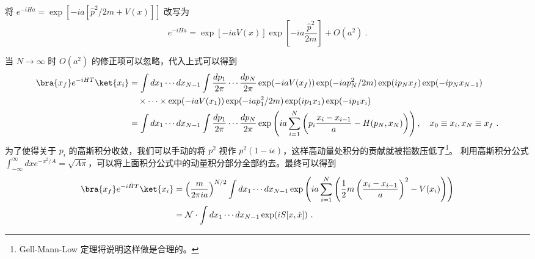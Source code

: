 将 $e^{-iH a}=\exp[-ia[\hat p^2/2m + V(x)]]$ 改写为
\begin{equation}
        e^{-iH a}
        =\exp[-iaV(x)]\exp\left[-ia\frac{\hat p^2}{2m}\right]+O(a^2)~.
\end{equation}

当 $N\rightarrow \infty$ 时 $O(a^2)$ 的修正项可以忽略，代入上式可以得到
\begin{equation}
\begin{aligned}
        \bra{x_f}e^{-iHT}\ket{x_i}&=\int d x_1\cdots d x_{N-1}\int \frac{d p_1}{2\pi} \cdots \frac{d p_N}{2\pi}
        \exp(-iaV(x_f))\exp(-iap_N^2/2m) \exp(ip_Nx_f)\exp(-ip_N x_{N-1})
        \\
        &\quad \times \cdots \times 
        \exp(-iaV(x_1))\exp(-iap_1^2/2m) \exp(ip_1x_1)\exp(-ip_1 x_{i})
        \\
        &=\int d x_1\cdots d x_{N-1}\int \frac{d p_1}{2\pi} \cdots \frac{d p_N}{2\pi}
        \exp\left(ia\sum_{i=1}^N\left(p_i\frac{x_i-x_{i-1}}{a}-H(p_N,x_N) \right)\right),\quad x_0\equiv x_i,x_N\equiv x_f~.
\end{aligned}
\end{equation}
为了使得关于 $p_i$ 的高斯积分收敛，我们可以手动的将 $p^2$ 视作 $p^2(1-i\epsilon)$，这样高动量处积分的贡献就被指数压低了\footnote{Gell-Mann-Low 定理将说明这样做是合理的。}。
    利用高斯积分公式 $\int_{-\infty}^{\infty} dx e^{-x^2/A}=\sqrt{A\pi}$，可以将上面积分公式中的动量积分部分全部约去。最终可以得到
\begin{equation}
\begin{aligned}
        \bra{x_f}e^{-i\hat HT}\ket{x_i}&=
        \left(\frac{m}{2\pi i a}\right)^{N/2}
        \int d x_1\cdots d x_{N-1} 
        \exp\left( ia\sum_{i=1}^N \left( \frac{1}{2}m \left(\frac{x_i-x_{i-1}}{a}\right)^2 - V(x_i) \right) \right)
        \\
        &=\mathcal{N} \cdot 
        \int d x_1\cdots d x_{N-1} \exp(iS[x,\dot x])~.
\end{aligned}
\end{equation}
